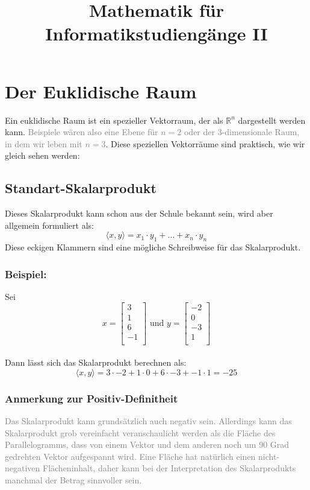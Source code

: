 \documentclass{report}
\title{Mathematik für Informatikstudiengänge II}
\date{}
\begin{document}
	\maketitle
	\tableofcontents
	\newpage
	\section{Der Euklidische Raum}
		Ein euklidische Raum ist ein spezieller Vektorraum, der als $\mathbb{R}^n$ dargestellt werden kann. \textcolor{gray}{Beispiele wären also eine Ebene für $n=2$ oder der 3-dimensionale Raum, in dem wir leben mit $n=3$}. Diese speziellen Vektorräume sind praktisch, wie wir gleich sehen werden:\\
		\subsection{Standart-Skalarprodukt}
			Dieses Skalarprodukt kann schon aus der Schule bekannt sein, wird aber allgemein formuliert als:
			\begin{equation}
				\langle x, y \rangle = x_1 \cdot y_1 + \dots + x_n \cdot y_n
			\end{equation}
			Diese eckigen Klammern sind eine mögliche Schreibweise für das Skalarprodukt.
		\subsubsection{Beispiel:}
			Sei \begin{equation*} x = \begin{bmatrix}
				3 \\ 1 \\ 6 \\ -1 \\
			\end{bmatrix} \mbox { und }y = \begin{bmatrix}
			-2 \\ 0 \\ -3 \\ 1 \\
			\end{bmatrix}\end{equation*} \\
			Dann lässt sich das Skalarprodukt berechnen als:\\
			\begin{equation*} \langle x, y \rangle = 3 \cdot -2 + 1 \cdot 0 + 6 \cdot -3 + -1 \cdot 1 =  -25 \end{equation*}
			\subsubsection{Anmerkung zur Positiv-Definitheit}
				\textcolor{gray}{Das Skalarprodukt kann grundsätzlich auch negativ sein. Allerdings kann das Skalarprodukt grob vereinfacht veranschaulicht werden als die Fläche des Parallelogramms, dass von einem Vektor und dem anderen noch um 90 Grad gedrehten Vektor aufgespannt wird. Eine Fläche hat natürlich einen nicht-negativen Flächeninhalt, daher kann bei der Interpretation des Skalarprodukts manchmal der Betrag sinnvoller sein.}
\end{document}
